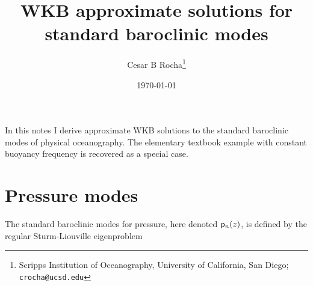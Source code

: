 \documentclass[11pt]{article}
\title{WKB approximate solutions for standard baroclinic modes}
\author{Cesar B Rocha\thanks{Scripps Institution of Oceanography, University of California, San Diego; \texttt{crocha@ucsd.edu}}}
\date{\today}
\begin{document}


\maketitle

In this notes I derive approximate WKB solutions to the standard baroclinic modes of physical oceanography. The elementary textbook example with constant buoyancy frequency is recovered as a special case. 

\section{Pressure modes}

The standard baroclinic modes for pressure, here denoted $\sp_n(z)$,  is defined by the regular Sturm-Liouville eigenproblem
\end{document}
